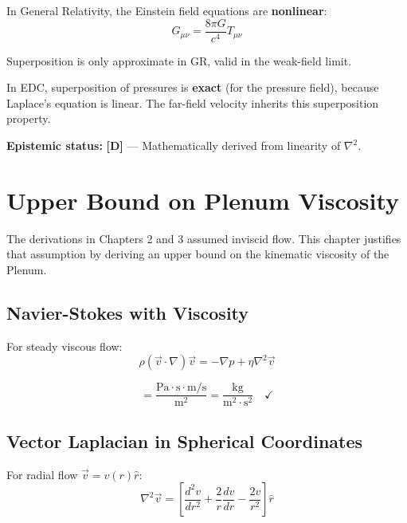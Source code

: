\documentclass[12pt,a4paper,openany]{book}
\theoremstyle{definition}
\theoremstyle{plain}
\theoremstyle{remark}
\newcommand{\derived}{\textcolor{derivedcolor}{\textbf{[D]}}}
\begin{document}
In General Relativity, the Einstein field equations are \textbf{nonlinear}:
\begin{equation}
G_{\mu\nu} = \frac{8\pi G}{c^4} T_{\mu\nu}
\end{equation}

Superposition is only approximate in GR, valid in the weak-field limit.

In EDC, superposition of pressures is \textbf{exact} (for the pressure field), because Laplace's equation is linear. The far-field velocity inherits this superposition property.

\textbf{Epistemic status:} \derived{} — Mathematically derived from linearity of $\nabla^2$.

\chapter{Upper Bound on Plenum Viscosity}
\label{ch:viscosity}

The derivations in Chapters 2 and 3 assumed inviscid flow. This chapter justifies that assumption by deriving an upper bound on the kinematic viscosity of the Plenum.

\section{Navier-Stokes with Viscosity}

For steady viscous flow:
\begin{equation}
\rho(\vec{v}\cdot\nabla)\vec{v} = -\nabla p + \eta \nabla^2 \vec{v}
\label{eq:navier_stokes}
\end{equation}

\begin{dimcheckbox}
\begin{equation}
[\eta \nabla^2 v] = \frac{\text{Pa}\cdot\text{s} \cdot \text{m}/\text{s}}{\text{m}^2} = \frac{\text{kg}}{\text{m}^2 \cdot \text{s}^2} \quad \checkmark
\end{equation}
\end{dimcheckbox}

\section{Vector Laplacian in Spherical Coordinates}

For radial flow $\vec{v} = v(r)\hat{r}$:
\begin{equation}
\nabla^2 \vec{v} = \left[\frac{d^2v}{dr^2} + \frac{2}{r}\frac{dv}{dr} - \frac{2v}{r^2}\right]\hat{r}
\label{eq:vector_laplacian}
\end{equation}
\end{document}
